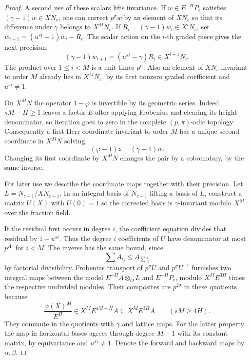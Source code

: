 \begin{proof}
A second use of these scalars lifts invariance. If
\(w\in E^{-H}P_c\) satisfies \((\gamma-1)w\in XN_c\), one can
correct \(p^\sigma w\) by an element of \(XN_c\) so that its
difference under \(\gamma\) belongs to \(X^MN_c\). If \(R_i=(\gamma-1)w_i\in X^iN_c\), set
\(w_{i+1}=(u^{si}-1)w_i-R_i\). The scalar action on the \(i\)-th
graded piece gives the next precision:
\[
 (\gamma-1)w_{i+1}=(u^{si}-\gamma)R_i\in X^{i+1}N_c .
\]
The product over \(1\le i<M\) is a unit times \(p^\sigma\).
Also an element of \(XN_c\) invariant to order \(M\) already lies in
\(X^MN_c\), by its first nonzero graded coefficient and
\(u^{si}\ne1\).

On \(X^MN\) the operator \(1-\varphi\) is invertible
by its geometric series. Indeed \(sM-H\ge1\) leaves a factor \(E\)
after applying Frobenius and clearing its height denominator, so
iteration goes to zero in the complete \((p,\pi)\)-adic topology.
Consequently a first Herr coordinate invariant to order \(M\)
has a unique second coordinate in \(X^MN\) solving
\[
 (\varphi-1)z=(\gamma-1)w.
\]
Changing its first coordinate by
\(X^MN\) changes the pair by a coboundary, by the same inverse.

For later use we describe the coordinate maps together with their
precision. Let \(L=N_{c-1}/XN_{c-1}\). In an integral basis of
\(N_{c-1}\) lifting a basis of \(L\), construct a matrix \(U(X)\)
with \(U(0)=1\) so the corrected basis is \(\gamma\)-invariant
modulo \(X^M\) over the fraction field.

If the residual first occurs
in degree \(i\), the coefficient equation divides that residual by
\(1-u^{si}\). Thus the degree \(i\) coefficients of \(U\) have
denominator at most \(p^{A_i}\) for \(i<M\). The inverse has the
same bound, since
\[
 \sum A_{i_j}\le A_{\sum i_j}
\]
by factorial
divisibility. Frobenius transport of \(p^\sigma U\) and
\(p^\sigma U^{-1}\) furnishes two integral maps between the model
\(E^{-H} A\otimes_O L\) and \(E^{-H}P_c\), modulo
\(X^M E^{3H}\) times the respective undivided modules. Their composites are \(p^{2\sigma}\) in these quotients because
\[
 \frac{\varphi(X)^M}{E^H}\in X^M E^{sM-H}A
                         \subseteq X^M E^{3H}A
 \qquad(sM\ge4H).
\]
They commute in the quotients with \(\gamma\) and lattice maps.
For the latter property the map in horizontal bases agrees through
degree \(M-1\) with its constant matrix, by equivariance and
\(u^{si}\ne1\). Denote the forward and backward maps by \(\alpha,\beta\).


\end{proof}
